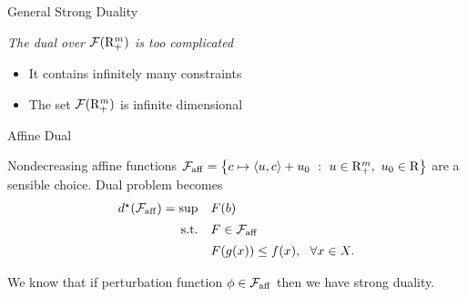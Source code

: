 \documentclass[9pt]{beamer}
\begin{document}
\begin{frame}{General Strong Duality}

  \emph{The dual over $\mathcal F(\mathrm{R}^m_+)$ is too complicated}

  \begin{itemize}
  \item It contains infinitely many constraints
  \item The set $\mathcal F(\mathrm{R}^m_+)$ is infinite dimensional
  \end{itemize}

  \vfill

  \vfill

  
\end{frame}

\begin{frame}{Affine Dual}

  Nondecreasing affine functions $\mathcal F_{{\rm{aff}}} = \left\{ c\mapsto \left<u, c\right> + u_0\ : \ u\in \mathrm{R}_+^m,~u_0\in \mathrm{R} \right\}$ are a sensible choice.
%
  Dual problem becomes
  \[
    \begin{array}{rl}
      d^\star(\mathcal F_{{\rm{aff}}}) = \sup  & F(b) \\[0.5em]
                       \mathrm{s.t.}   & F\in \mathcal F_{{\rm{aff}}} \\[0.5em]
                             & F(g(x)) \leq f(x),~~ \forall x \in X.
    \end{array}
  \]

  \vfill

  We know that if perturbation function $\phi\in \mathcal F_{{\rm{aff}}}$ then we have strong duality.

  \vfill

\end{frame}
\end{document}
